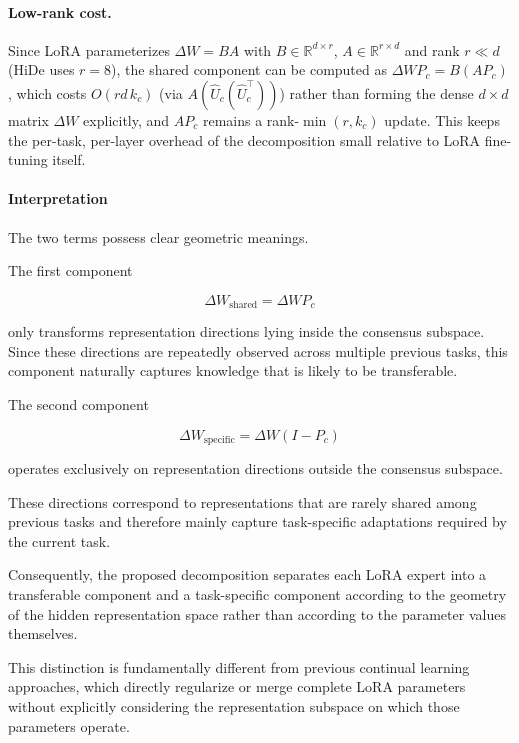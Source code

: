 \documentclass[a4paper]{article}
\begin{document}
\paragraph{Low-rank cost.} Since LoRA parameterizes $\Delta W = BA$ with $B\in\mathbb{R}^{d\times r}$, $A\in\mathbb{R}^{r\times d}$ and rank $r\ll d$ (HiDe uses $r{=}8$), the shared component can be computed as $\Delta W P_c = B(AP_c)$, which costs $O(rd\,k_c)$ (via $A(\hat U_c(\hat U_c^\top))$) rather than forming the dense $d\times d$ matrix $\Delta W$ explicitly, and $A P_c$ remains a rank-$\min(r,k_c)$ update. This keeps the per-task, per-layer overhead of the decomposition small relative to LoRA fine-tuning itself.


\paragraph{Interpretation}

The two terms possess clear geometric meanings.

The first component

\begin{equation}
\Delta W_{\mathrm{shared}}
=
\Delta W P_c
\end{equation}

only transforms representation directions lying inside the consensus subspace. Since these directions are repeatedly observed across multiple previous tasks, this component naturally captures knowledge that is likely to be transferable.

The second component

\begin{equation}
\Delta W_{\mathrm{specific}}
=
\Delta W(I-P_c)
\end{equation}

operates exclusively on representation directions outside the consensus subspace.

These directions correspond to representations that are rarely shared among previous tasks and therefore mainly capture task-specific adaptations required by the current task.

Consequently, the proposed decomposition separates each LoRA expert into a transferable component and a task-specific component according to the geometry of the hidden representation space rather than according to the parameter values themselves.

This distinction is fundamentally different from previous continual learning approaches, which directly regularize or merge complete LoRA parameters without explicitly considering the representation subspace on which those parameters operate.
\end{document}
